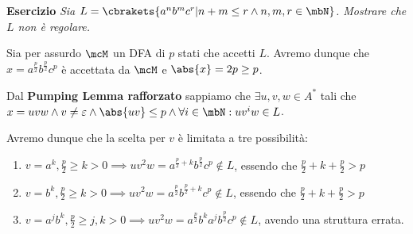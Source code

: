\textbf{Esercizio} \textit{Sia \(L = \cbrakets{a^{n}b^{m}c^r \vert n+m \leq r \land n,m,r \in \mbN}\). Mostrare che \(L\) non è regolare.}

Sia per assurdo \(\mcM\) un DFA di \(p\) stati che accetti \(L\). Avremo dunque che \(x=a^{\frac{p}{2}}b^{\frac{p}{2}}c^{p}\) è accettata da \(\mcM\) e \(\abs{x}=2p \geq p\).

Dal \textbf{Pumping Lemma rafforzato} sappiamo che \(\exists u,v,w \in A^*\) tali che \(x=uvw \land v \neq \varepsilon \land \abs{uv} \leq p \land \forall i \in \mbN: uv^{i}w\in L\).

Avremo dunque che la scelta per \(v\) è limitata a tre possibilità:
\begin{enumerate}
    \item \(v=a^k, \frac{p}{2} \geq k > 0 \implies uv^{2}w = a^{\frac{p}{2}+k}b^{\frac{p}{2}}c^{p} \nin L\),  essendo che \(\frac{p}{2}+k+\frac{p}{2} > p\)
    \item \(v=b^k, \frac{p}{2} \geq k > 0 \implies uv^{2}w = a^{\frac{p}{2}}b^{\frac{p}{2}+k}c^{p} \nin L \), essendo che \(\frac{p}{2}+k+\frac{p}{2} > p\)
    \item \(v=a^{j}b^k, \frac{p}{2} \geq j,k > 0 \implies uv^{2}w = a^{\frac{p}{2}}b^{k}a^{j}b^{\frac{p}{2}}c^{p} \nin L \), avendo una struttura errata.
\end{enumerate}